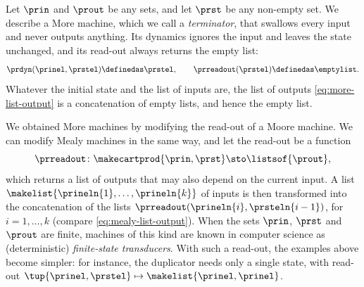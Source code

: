 \begin{example}[Terminator]
    \label{exa:more-terminator}
    Let $\prin$ and $\prout$ be any sets, and let $\prst$ be any non-empty set.
    We describe a More machine, which we call a \emph{terminator}, that swallows every input and never outputs anything.
    Its dynamics ignores the input and leaves the state unchanged, and its read-out always returns the empty list:
    \begin{equation}
        \prdyn(\prinel, \prstel) \definedas \prstel,
        \qquad
        \prreadout(\prstel) \definedas \emptylist.
    \end{equation}
    Whatever the initial state and the list of inputs are, the list of outputs \cref{eq:more-list-output} is a concatenation of empty lists, and hence the empty list.
\end{example}

\begin{remark}
    \label{rem:more-of-mealy-type}
    We obtained More machines by modifying the read-out of a Moore machine.
    We can modify Mealy machines in the same way, and let the read-out be a function
    \begin{equation}
        \prreadout \colon \makecartprod{\prin, \prst} \sto \listsof{\prout},
    \end{equation}
    which returns a list of outputs that may also depend on the current input.
    A list $\makelist{\prineln{1}, \dots, \prineln{k}}$ of inputs is then transformed into the concatenation of the lists $\prreadout(\prineln{i}, \prsteln{i-1})$, for $i = 1, \dots, k$ (compare \cref{eq:mealy-list-output}).
    When the sets $\prin$, $\prst$ and $\prout$ are finite, machines of this kind are known in computer science as (deterministic) \emph{finite-state transducers}.
    With such a read-out, the examples above become simpler: for instance, the duplicator needs only a single state, with read-out $\tup{\prinel, \prstel} \mapsto \makelist{\prinel, \prinel}$.
\end{remark}


